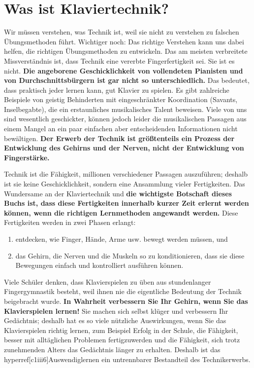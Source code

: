\section{Was ist Klaviertechnik?}
\label{c1i2}

Wir müssen verstehen, was Technik ist, weil sie nicht zu verstehen zu falschen Übungsmethoden führt.
Wichtiger noch: Das richtige Verstehen kann uns dabei helfen, die richtigen Übungsmethoden zu entwickeln.
Das am meisten verbreitete Missverständnis ist, dass Technik eine vererbte Fingerfertigkeit sei.
Sie ist es nicht.
\textbf{Die angeborene Geschicklichkeit von vollendeten Pianisten und von Durchschnittsbürgern ist gar nicht so unterschiedlich.}
Das bedeutet, dass praktisch jeder lernen kann, gut Klavier zu spielen.
Es gibt zahlreiche Beispiele von geistig Behinderten mit eingeschränkter Koordination (Savants, Inselbegabte), die ein erstaunliches musikalisches Talent beweisen.
Viele von uns sind wesentlich geschickter, können jedoch leider die musikalischen Passagen aus einem Mangel an ein paar einfachen aber entscheidenden Informationen nicht bewältigen.
\textbf{Der Erwerb der Technik ist größtenteils ein Prozess der Entwicklung des Gehirns und der Nerven, nicht der Entwicklung von Fingerstärke.}

Technik ist die Fähigkeit, millionen verschiedener Passagen auszuführen; deshalb ist sie keine Geschicklichkeit, sondern eine Ansammlung vieler Fertigkeiten.
Das Wundersame an der Klaviertechnik und \textbf{die wichtigste Botschaft dieses Buchs ist, dass diese Fertigkeiten innerhalb kurzer Zeit erlernt werden können, wenn die richtigen Lernmethoden angewandt werden.}
Diese Fertigkeiten werden in zwei Phasen erlangt:

\begin{enumerate}[label={\arabic*.}] 
 \item entdecken, wie Finger, Hände, Arme usw. bewegt werden müssen, und
 \item das Gehirn, die Nerven und die Muskeln so zu konditionieren, dass sie diese Bewegungen einfach und kontrolliert ausführen können.
\end{enumerate}

Viele Schüler denken, dass Klavierspielen zu üben aus stundenlanger Fingergymnastik besteht, weil ihnen nie die eigentliche Bedeutung der Technik beigebracht wurde.
\textbf{In Wahrheit verbessern Sie Ihr Gehirn, wenn Sie das Klavierspielen lernen!}
Sie machen sich selbst klüger und verbessern Ihr Gedächtnis; deshalb hat es so viele nützliche Auswirkungen, wenn Sie das Klavierspielen richtig lernen, zum Beispiel Erfolg in der Schule, die Fähigkeit, besser mit alltäglichen Problemen fertigzuwerden und die Fähigkeit, sich trotz zunehmenden Alters das Gedächtnis länger zu erhalten.
Deshalb ist das \\hyperref[c1iii6]{Auswendiglernen} ein untrennbarer Bestandteil des Technikerwerbs.

